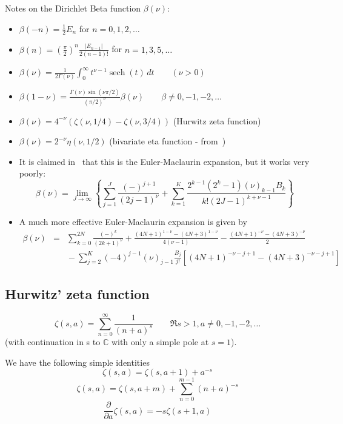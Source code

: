 \documentclass[10pt,dvipdfmx,letterpaper,twoside]{article}
\let\O=\operatorname
\newcommand{\CC}{{\mathbb{C}}}
\newenvironment{implementation}{\noindent\begin{framed}}{\end{framed}}
\let\Gam=\Gamma
\begin{document}
\begin{implementation}
Notes on the Dirichlet Beta function $\beta(\nu)$:
\begin{itemize}
\item $\beta(-n) = \tfrac12 E_n$ for $n=0,1,2,\dots$
\item $\beta(n) = (\tfrac\pi2)^n\frac{|E_{n-1}|}{2(n-1)!}$ for $n=1,3,5,\dots$
\item $\beta(\nu) = \frac{1}{2\Gam(\nu)}\int_0^\infty t^{\nu-1}\O{sech}(t)\,dt \qquad(\nu>0)$
\item $\beta(1-\nu) = \frac{\Gam(\nu)\sin(\nu\pi/2)}{(\pi/2)^\nu}\beta(\nu) \qquad \beta\neq0,-1,-2,\dots$
\item $\beta(\nu) = 4^{-\nu}\left(\zeta(\nu,1/4) - \zeta(\nu,3/4)\right)$ (Hurwitz zeta function)
\item $\beta(\nu) = 2^{-\nu}\eta(\nu,1/2)$ (bivariate eta function - from~\cite{atlas:oldham})
\item It is claimed in~\cite{atlas:oldham} that this is the Euler-Maclaurin expansion, but it works very poorly:
    \[ \beta(\nu) = \lim_{J\to\infty}\left\{  \sum_{j=1}^J \frac{(-)^{j+1}}{(2j-1)^\nu}
        + \sum_{k=1}^K \frac{2^{k-1}(2^k-1)(\nu)_{k-1} B_k}{k! (2J-1)^{k+\nu-1}} \right\}\]
\item A much more effective Euler-Maclaurin expansion is given by
    \begin{eqnarray*}
    \beta(\nu) &=& \sum_{k=0}^{2N}\frac{(-)^k}{(2k+1)^\nu}
            + \frac{(4N+1)^{1-\nu} - (4N+3)^{1-\nu}}{4(\nu-1)} - \frac{(4N+1)^{-\nu} - (4N+3)^{-\nu}}{2} \\
        && {} - \sum_{j=2}^K(-4)^{j-1}(\nu)_{j-1}\frac{B_j}{j!}\left[(4N+1)^{-\nu-j+1} - (4N+3)^{-\nu-j+1}\right]
    \end{eqnarray*}
\end{itemize}
\end{implementation}

\subsection{Hurwitz' zeta function}
\[ \zeta(s,a) = \sum_{n=0}^\infty \frac{1}{(n+a)^s} \qquad \Re s>1, a\neq0,-1,-2,\dots \]
(with continuation in s to $\CC$ with only a simple pole at $s=1$).

We have the following simple identities
\[ \zeta(s,a) = \zeta(s,a+1) + a^{-s} \]
\[ \zeta(s,a) = \zeta(s,a+m) + \sum_{n=0}^{m-1} (n+a)^{-s} \]
\[ \frac{\partial}{\partial a}\zeta(s,a) = -s \zeta(s+1,a) \]
\end{document}
